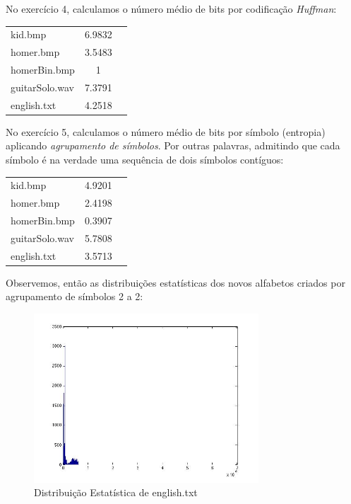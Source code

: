 \documentclass[12pt]{article}
\begin{document}
  \pagebreak

  No exercício 4, calculamos o número médio de bits por codificação
  \textit{Huffman}:

  \begin{tabular}{ l c r }
    kid.bmp & 6.9832 \\
    homer.bmp & 3.5483 \\
    homerBin.bmp & 1 \\
    guitarSolo.wav & 7.3791 \\
    english.txt & 4.2518 \\
  \end{tabular}

  No exercício 5, calculamos o número médio de bits por símbolo (entropia)
  aplicando \textit{agrupamento de símbolos}. Por outras palavras, admitindo
  que cada símbolo é na verdade uma sequência de dois símbolos contíguos:

  \begin{tabular}{ l c r }
    kid.bmp & 4.9201 \\
    homer.bmp & 2.4198 \\
    homerBin.bmp & 0.3907 \\
    guitarSolo.wav & 5.7808 \\
    english.txt & 3.5713 \\
  \end{tabular}

  Observemos, então as distribuições estatísticas dos novos alfabetos criados
  por agrupamento de símbolos 2 a 2:
  
  \begin{figure}[H]
    \centering
      \includegraphics[width=0.75\textwidth]{ex5kid}
    \caption{Distribuição Estatística de english.txt}
  \end{figure}
\end{document}
